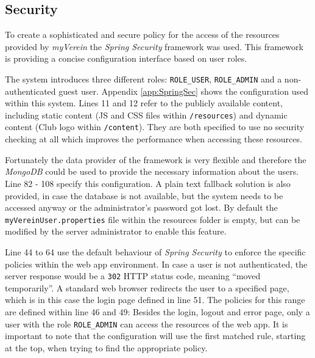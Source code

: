 \subsection{Security}
\label{sec:ImplementationSec}

To create a sophisticated and secure policy for the access of the resources provided by \emph{myVerein} the \emph{Spring Security} framework was used. This framework is providing a concise configuration interface based on user roles.

The system introduces three different roles: \texttt{ROLE\_USER}, \texttt{ROLE\_ADMIN} and a non-authenticated guest user. Appendix \vref{app:SpringSec} shows the configuration used within this system. Lines 11 and 12 refer to the publicly available content, including static content (\gls{JS} and \gls{CSS} files within \texttt{/resources}) and dynamic content (Club logo within \texttt{/content}). They are both specified to use no security checking at all which improves the performance when accessing these resources.

Fortunately the data provider of the framework is very flexible and therefore the \emph{MongoDB} could be used to provide the necessary information about the users. Line 82 - 108 specify this configuration. A plain text fallback solution is also provided, in case the database is not available, but the system needs to be accessed anyway or the administrator's password got lost. By default the \texttt{myVereinUser.properties} file within the resources folder is empty, but can be modified by the server administrator to enable this feature.

Line 44 to 64 use the default behaviour of \emph{Spring Security} to enforce the specific policies within the web app environment. In case a user is not authenticated, the server response would be a \texttt{302} HTTP status code, meaning \enquote{moved temporarily}. A standard web browser redirects the user to a specified page, which is in this case the login page defined in line 51. The policies for this range are defined within line 46 and 49: Besides the login, logout and error page, only a user with the role \texttt{ROLE\_ADMIN} can access the resources of the web app. It is important to note that the configuration will use the first matched rule, starting at the top, when trying to find the appropriate policy.

